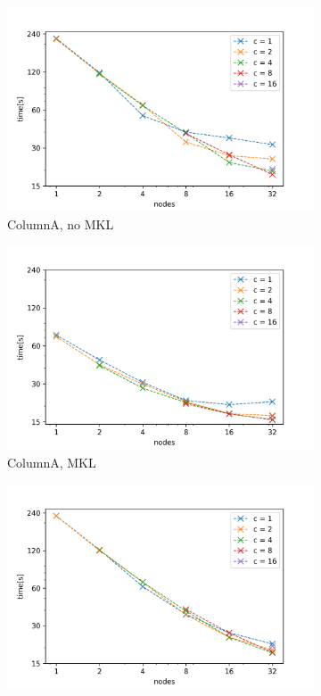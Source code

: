 \documentclass{article}
\begin{document}
\begin{figure}[ht!]
    \centering
    \begin{subfigure}[b]{0.45\textwidth}
        \includegraphics[width=\textwidth]{charts/s_50000_1000_5}
        \caption{ColumnA, no MKL}
    \end{subfigure}
    \begin{subfigure}[b]{0.45\textwidth}
        \includegraphics[width=\textwidth]{charts/s_50000_1000_5_m}
        \caption{ColumnA, MKL}
    \end{subfigure}
    \begin{subfigure}[b]{0.45\textwidth}
        \includegraphics[width=\textwidth]{charts/s_50000_1000_5_i}

\end{subfigure}
\end{figure}
\end{document}
